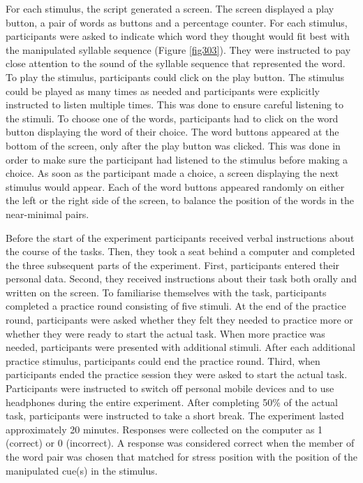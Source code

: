 For each stimulus, the script generated a screen. The screen displayed a play button, a pair of words as buttons and a percentage counter. For each stimulus, participants were asked to indicate which word they thought would fit best with the manipulated syllable sequence (Figure \ref{fig303}). They were instructed to pay close attention to the sound of the syllable sequence that represented the word. To play the stimulus, participants could click on the play button. The stimulus could be played as many times as needed and participants were explicitly instructed to listen multiple times. This was done to ensure careful listening to the stimuli. To choose one of the words, participants had to click on the word button displaying the word of their choice. The word buttons appeared at the bottom of the screen, only after the play button was clicked. This was done in order to make sure the participant had listened to the stimulus before making a choice. As soon as the participant made a choice, a screen displaying the next stimulus would appear. Each of the word buttons appeared randomly on either the left or the right side of the screen, to balance the position of the words in the near-minimal pairs.

Before the start of the experiment participants received verbal instructions about the course of the tasks. Then, they took a seat behind a computer and completed the three subsequent parts of the experiment. First, participants entered their personal data. Second, they received instructions about their task both orally and written on the screen. To familiarise themselves with the task, participants completed a practice round consisting of five stimuli. At the end of the practice round, participants were asked whether they felt they needed to practice more or whether they were ready to start the actual task. When more practice was needed, participants were presented with additional stimuli. After each additional practice stimulus, participants could end the practice round. Third, when participants ended the practice session they were asked to start the actual task. Participants were instructed to switch off personal mobile devices and to use headphones during the entire experiment. After completing 50\% of the actual task, participants were instructed to take a short break. The experiment lasted approximately 20 minutes. Responses were collected on the computer as 1 (correct) or 0 (incorrect). A response was considered correct when the member of the word pair was chosen that matched for stress position with the position of the manipulated cue(s) in the stimulus.



